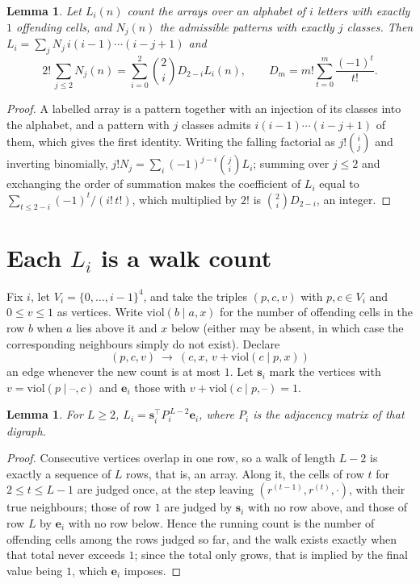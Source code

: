 \documentclass[11pt,a4paper]{article}
\theoremstyle{plain}
\newtheorem{lemma}[theorem]{Lemma}
\theoremstyle{definition}
\begin{document}
\begin{lemma}\label{lem:inv}
Let $L_i(n)$ count the arrays over an alphabet of $i$ letters with exactly $1$ offending
cells, and $N_j(n)$ the admissible patterns with exactly $j$ classes. Then
$L_i=\sum_j N_j\,i(i-1)\cdots(i-j+1)$ and
\[
2!\,\sum_{j\le2}N_j(n)=\sum_{i=0}^{2}\binom{2}{i}D_{2-i}L_i(n),
\qquad D_m=m!\sum_{t=0}^{m}\frac{(-1)^t}{t!} .
\]
\end{lemma}

\begin{proof}
A labelled array is a pattern together with an injection of its classes into the alphabet,
and a pattern with $j$ classes admits $i(i-1)\cdots(i-j+1)$ of them, which gives the first
identity. Writing the falling factorial as $j!\binom{i}{j}$ and inverting binomially,
$j!N_j=\sum_i(-1)^{j-i}\binom{j}{i}L_i$; summing over $j\le2$ and exchanging the
order of summation makes the coefficient of $L_i$ equal to
$\sum_{t\le2-i}(-1)^t/(i!\,t!)$, which multiplied by $2!$ is
$\binom{2}{i}D_{2-i}$, an integer.
\end{proof}

\section{Each $L_i$ is a walk count}

Fix $i$, let $V_i=\{0,\dots,i-1\}^{4}$, and take the triples $(p,c,v)$ with
$p,c\in V_i$ and $0\le v\le1$ as vertices. Write $\mathrm{viol}(b\mid a,x)$ for the number
of offending cells in the row $b$ when $a$ lies above it and $x$ below (either may be
absent, in which case the corresponding neighbours simply do not exist). Declare
\[
(p,c,v)\ \longrightarrow\ (c,x,\,v+\mathrm{viol}(c\mid p,x))
\]
an edge whenever the new count is at most $1$. Let $\mathbf{s}_i$ mark the vertices with
$v=\mathrm{viol}(p\mid\text{--},c)$ and $\mathbf{e}_i$ those with
$v+\mathrm{viol}(c\mid p,\text{--})=1$.

\begin{lemma}\label{lem:walk}
For $L\ge2$, $L_i=\mathbf{s}_i^{\!\top}P_i^{\,L-2}\mathbf{e}_i$, where $P_i$ is the
adjacency matrix of that digraph.
\end{lemma}

\begin{proof}
Consecutive vertices overlap in one row, so a walk of length $L-2$ is exactly a sequence
of $L$ rows, that is, an array. Along it, the cells of row $t$ for $2\le t\le L-1$ are
judged once, at the step leaving $(r^{(t-1)},r^{(t)},\cdot)$, with their true neighbours;
those of row $1$ are judged by $\mathbf{s}_i$ with no row above, and those of row
$L$ by $\mathbf{e}_i$ with no row below. Hence the running count is the number of
offending cells among the rows judged so far, and the walk exists exactly when that total
never exceeds $1$; since the total only grows, that is implied by the final value being
$1$, which $\mathbf{e}_i$ imposes.
\end{proof}
\end{document}
